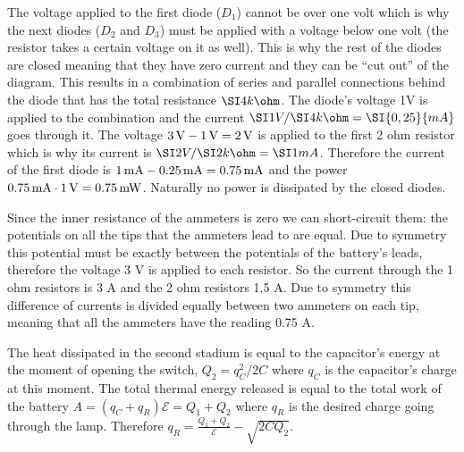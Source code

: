 \documentclass[11pt]{article}
\begin{document}

\solueng
The voltage applied to the first diode ($D_1$) cannot be over one volt which is why the next diodes ($D_2$ and $D_3$) must be applied with a voltage below one volt (the resistor takes a certain voltage on it as well). This is why the rest of the diodes are closed meaning that they have zero current and they can be “cut out” of the diagram. This results in a combination of series and parallel connections behind the diode that has the total resistance $\SI 4{k\ohm}$. The diode’s voltage 1V is applied to the combination and the current $\SI 1V /\SI 4{k\ohm}= \SI {0,25}{mA}$ goes through it. The voltage $\SI 3V-\SI 1V=\SI 2V$ is applied to the first 2 ohm resistor which is why its current is $\SI 2V/\SI 2{k\ohm}=\SI 1{mA}$. Therefore the current of the first diode is $\SI 1{mA}-\SI {0,25}{mA}=\SI{0,75}{mA}$ and the power $\SI{0,75}{mA}\cdot \SI 1V=\SI{0,75}{mW}$. Naturally no power is dissipated by the closed diodes.
\probend
\bigskip


\solueng
Since the inner resistance of the ammeters is zero we can short-circuit them: the potentials on all the tips that the ammeters lead to are equal. Due to symmetry this potential must be exactly between the potentials of the battery’s leads, therefore the voltage 3 V is applied to each resistor. So the current through the 1 ohm resistors is 3 A and the 2 ohm resistors 1.5 A. Due to symmetry this difference of currents is divided equally between two ammeters on each tip, meaning that all the ammeters have the reading 0.75 A.
\probend
\bigskip


\solueng
The heat dissipated in the second stadium is equal to the capacitor’s energy at the moment of opening the switch, $Q_2=q_C^2/2C$ where $q_C$ is the capacitor’s charge at this moment. The total thermal energy released is equal to the total work of the battery $A=(q_C+q_R)\mathcal E=Q_1+Q_2$ where $q_R$ is the desired charge going through the lamp. Therefore $q_R=\frac{Q_1+Q_2}{\mathcal E}-\sqrt{2CQ_2}$.
\probend
\bigskip
\end{document}
